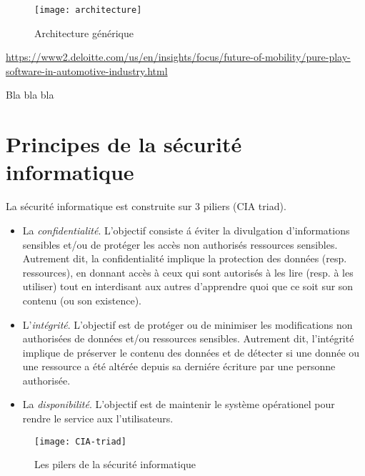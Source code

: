 \FloatBarrier
\begin{figure}
    \texttt{[image: architecture]}
    \caption{Architecture g\'en\'erique}
    \label{fig:archi}
\end{figure}
\url{https://www2.deloitte.com/us/en/insights/focus/future-of-mobility/pure-play-software-in-automotive-industry.html}
\FloatBarrier

Bla bla bla


\section {Principes de la s\'ecurit\'e informatique}
\medskip
{\Huge L}a s\'ecurit\'e informatique est construite sur 3 piliers (CIA triad).
  
\begin{itemize}
\setlength\itemsep{1em}
\item La \emph{confidentialit\'e}. L'objectif consiste \'a \'eviter la divulgation d'informations sensibles et/ou de prot\'eger les acc\`es non authoris\'es ressources sensibles. Autrement dit, la confidentialit\'e implique la protection des donn\'ees (resp. ressources), en donnant acc\`es \`a ceux qui sont autoris\'es \`a les lire (resp. \`a les utiliser) tout en interdisant aux autres d'apprendre quoi que ce soit sur son contenu (ou son existence).  
\item L'\emph{int\'egrit\'e}. L'objectif est de prot\'eger ou de minimiser les modifications non authoris\'ees de donn\'ees et/ou ressources sensibles. Autrement dit, l'int\'egrit\'e implique de pr\'eserver le contenu des donn\'ees et de d\'etecter si une donn\'ee ou une ressource a \'et\'e alt\'er\'ee depuis sa derni\'ere \'ecriture par une personne authoris\'ee.  
\item La \emph{disponibilit\'e}. L'objectif est de maintenir le syst\`eme op\'erationel pour rendre le service aux l'utilisateurs.  
\end{itemize}

\FloatBarrier
\begin{figure}[h]
	\centering
    \texttt{[image: CIA-triad]}
    \caption{Les pilers de la s\'ecurit\'e informatique}
    \label{fig:CIA}
\end{figure}
\FloatBarrier


